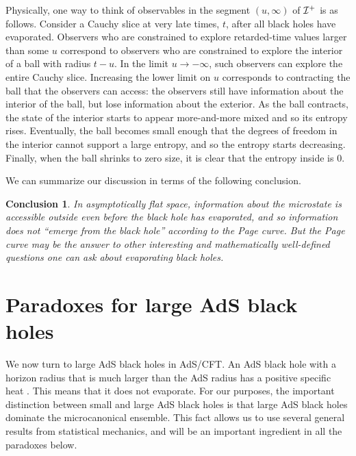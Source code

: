 \documentclass[12pt]{article}
\def \scrip{{\cal I}^{+}}
\newtheorem{lesson}{Conclusion}
\begin{document}
Physically, one way to think of observables in the segment $(u, \infty)$ of  $\scrip$ is as follows.  Consider a Cauchy slice at very late times, $t$, after all black holes have evaporated. Observers who are constrained to explore retarded-time values larger than some $u$ correspond to observers who are constrained to explore the interior of a ball with radius $t - u$. In the limit $u \rightarrow -\infty$, such observers can explore the entire Cauchy slice. Increasing the lower limit on $u$ corresponds to contracting the ball that the observers can access: the observers still have information about the interior of the ball, but lose information about the exterior. As the ball contracts, the state of the interior starts to appear more-and-more mixed and so its entropy rises.  Eventually, the ball becomes small enough that the degrees of freedom in the interior cannot support a large entropy, and so the entropy starts decreasing. Finally, when the ball shrinks to zero size, it is clear that the entropy inside is 0.  

 







































We can summarize our discussion in terms of the following conclusion.
\begin{lesson} 
In asymptotically flat space, information about the microstate is accessible outside even before the black hole has evaporated, and so information does not ``emerge from the black hole'' according to the Page curve.
 But the Page curve may be the answer to other interesting and mathematically well-defined questions one can ask about evaporating black holes.
\end{lesson}

\section{Paradoxes for large AdS black holes \label{seclargeads}}
We now turn to large AdS black holes in AdS/CFT. An AdS black hole with a horizon radius that is much larger than the AdS radius has a positive specific heat \cite{Hawking:1982dh}. This means that it does not evaporate. For our purposes, the important distinction between small and large AdS black holes is that large AdS black holes dominate the microcanonical ensemble. This fact allows us to use several general 
results from statistical mechanics, and will be an important ingredient in all the paradoxes below. 
\end{document}
